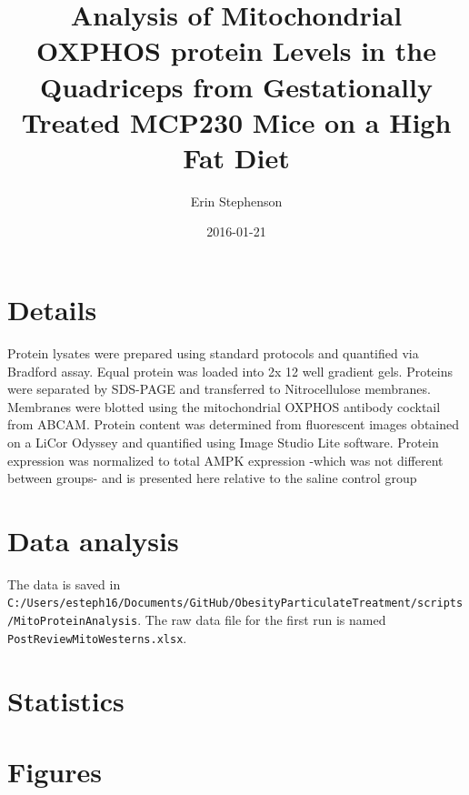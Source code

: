 \documentclass{article}
\begin{document}


\title{Analysis of Mitochondrial OXPHOS protein Levels in the Quadriceps from Gestationally Treated MCP230 Mice on a High Fat Diet}
\author{Erin Stephenson}
\date{2016-01-21}
\maketitle

\section*{Details}
{Protein lysates were prepared using standard protocols and quantified via Bradford assay. Equal protein was loaded into 2x 12 well gradient gels. Proteins were separated by SDS-PAGE and transferred to Nitrocellulose membranes. Membranes were blotted using the mitochondrial OXPHOS antibody cocktail from ABCAM. Protein content was determined from fluorescent images obtained on a LiCor Odyssey and quantified using Image Studio Lite software. Protein expression was normalized to total AMPK expression -which was not different between groups- and is presented here relative to the saline control group}
\section*{Data analysis}

The data is saved in \verb+C:/Users/esteph16/Documents/GitHub/ObesityParticulateTreatment/scripts/MitoProteinAnalysis+.  The raw data file for the first run is named \verb+PostReviewMitoWesterns.xlsx+.  

\section*{Statistics}
\section*{Figures}
\end{document}
